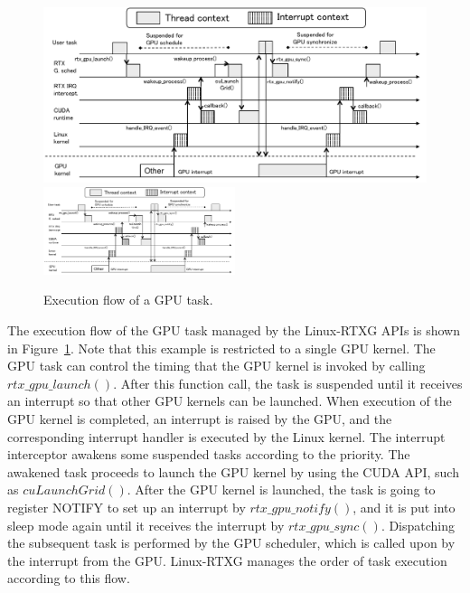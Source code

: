 \begin{figure}[!t]
\begin{center}
 \ifthesis
 \includegraphics[width=\textwidth]{img/gsched_controlflow.pdf}
 \else
 \includegraphics[width=0.5\textwidth]{img/gsched_controlflow.pdf}
 \fi
\caption{Execution flow of a GPU task.}
\vspace{-4mm}
\label{fig:controlflow}
\end{center}
\end{figure}

The execution flow of the GPU task managed by the Linux-RTXG APIs is shown in Figure~\ref{fig:controlflow}.
Note that this example is restricted to a single GPU kernel.
The GPU task can control the timing that the GPU kernel is invoked by calling $rtx\_gpu\_launch()$.
After this function call, the task is suspended until it receives an interrupt so that other GPU kernels can be launched.
When execution of the GPU kernel is completed, an interrupt is raised by the GPU, and the corresponding interrupt handler is executed by the Linux kernel.
The interrupt interceptor awakens some suspended tasks according to the priority.
The awakened task proceeds to launch the GPU kernel by using the CUDA API, such as $cuLaunchGrid()$.
After the GPU kernel is launched, the task is going to register NOTIFY to set up an interrupt by $rtx\_gpu\_notify()$, and it is put into sleep mode again until it receives the interrupt by $rtx\_gpu\_sync()$.
Dispatching the subsequent task is performed by the GPU scheduler, which is called upon by the interrupt from the GPU.
Linux-RTXG manages the order of task execution according to this flow.


